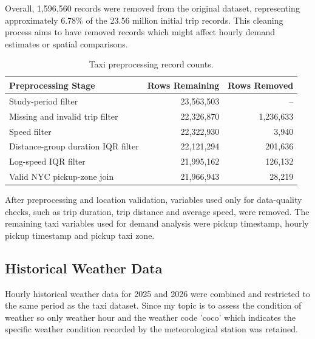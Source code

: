 \documentclass[11pt]{article}
\begin{document}
Overall, 1,596,560 records were removed from the original dataset, representing approximately 6.78\% of the 23.56 million initial trip records. This cleaning process aims to have removed records which might affect hourly demand estimates or spatial comparisons.


\begin{table}[ht]
    \centering
    \caption{Taxi preprocessing record counts.}
    \label{tab:taxi_preprocessing}

    \begin{tabular}{lrr}
        \toprule

        \textbf{Preprocessing Stage}
        & \textbf{Rows Remaining}
        & \textbf{Rows Removed} \\

        \midrule

        Study-period filter
        & 23,563,503
        & -- \\

        Missing and invalid trip filter
        & 22,326,870
        & 1,236,633 \\

        Speed filter
        & 22,322,930
        & 3,940 \\

        Distance-group duration IQR filter
        & 22,121,294
        & 201,636 \\

        Log-speed IQR filter
        & 21,995,162
        & 126,132 \\

        Valid NYC pickup-zone join
        & 21,966,943
        & 28,219 \\

        \bottomrule
    \end{tabular}
\end{table}


After preprocessing and location validation, variables used only for data-quality checks, such as 
trip duration, trip distance and average speed, were removed. The remaining taxi variables used 
for demand analysis were pickup timestamp, hourly pickup timestamp and pickup taxi zone.


\subsection{Historical Weather Data}

Hourly historical weather data for 2025 and 2026 were combined and restricted to the same period 
as the taxi dataset. Since my topic is to assess the condition of weather so only weather hour and the weather code 'coco' which  indicates the specific weather condition recorded by the meteorological station was retained.
\end{document}

